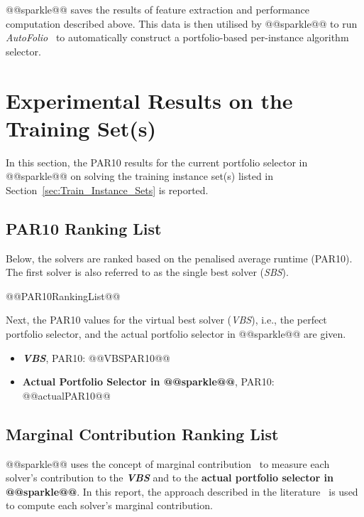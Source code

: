 \documentclass[british]{article}
\begin{document}
@@sparkle@@ saves the results of feature extraction and performance computation described above. This data is then utilised by @@sparkle@@ to run \emph{AutoFolio}~\cite{LinEtAl15} to automatically construct a portfolio-based per-instance algorithm selector.

\section{Experimental Results on the Training Set(s)}
\label{sec:Experimental_Results_Train}

In this section, the PAR10 results for the current portfolio selector in @@sparkle@@ on solving the training instance set(s) listed in Section~\ref{sec:Train_Instance_Sets} is reported.

\subsection{PAR10 Ranking List}
\label{sec:PAR10_Ranking}

Below, the solvers are ranked based on the penalised average runtime (PAR10). The first solver is also referred to as the single best solver (\emph{SBS}).

\begin{enumerate}
@@PAR10RankingList@@
\end{enumerate}

Next, the PAR10 values for the virtual best solver (\emph{VBS}), i.e., the perfect portfolio selector, and the actual portfolio selector in @@sparkle@@ are given.

\begin{itemize}
\item \textbf{\emph{VBS}}, PAR10: @@VBSPAR10@@
\item \textbf{Actual Portfolio Selector in @@sparkle@@}, PAR10: @@actualPAR10@@
\end{itemize}

\subsection{Marginal Contribution Ranking List}
\label{sec:Marginal_Contribution_Ranking}

@@sparkle@@ uses the concept of marginal contribution~\cite{XuEtAl12} to measure each solver's contribution to the \textbf{\emph{VBS}} and to the \textbf{actual portfolio selector in @@sparkle@@}. In this report, the approach described in the literature~\cite{FreEtAl16} is used to compute each solver's marginal contribution.
\end{document}
